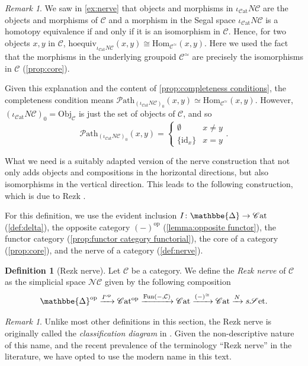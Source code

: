 \documentclass[11pt, a4paper]{amsart}
\def\DDelta{{\mathbbe{\Delta}}}
\newcommand{\DD}{\DDelta}
\newcommand{\cC}{\mathcal{C}}
\newcommand{\sN}{\mathscr{N}}
\newcommand{\Hom}{\mathrm{Hom}}
\newcommand{\op}{\mathrm{op}}
\newcommand{\Fun}{\mathrm{Fun}}
\newcommand{\sSet}{s\mathscr{S}\mathrm{et}}
\newcommand{\Cat}{\mathscr{C}\mathrm{at}}
\newcommand{\id}{\mathrm{id}}
\newcommand{\Obj}{\mathrm{Obj}}
\newcommand{\inccat}{\iota_{\Cat}}
\newcommand{\hoequiv}{\mathrm{hoequiv}}
\newcommand{\Path}{\mathscr{P}\mathrm{ath}}
\theoremstyle{definition}
\newtheorem{definition}[equation]{Definition}
\theoremstyle{remark}
\newtheorem{remark}[equation]{Remark}
\numberwithin{equation}{section}
\begin{document}
\begin{remark} \label{rem:nerve not complete}
 We saw in \cref{ex:nerve} that objects and morphisms in $\inccat N\cC$ are the objects and morphisms of $\cC$ and a morphism in the Segal space $\inccat N\cC$ is a homotopy equivalence if and only if it is an isomorphism in $\cC$. Hence, for two objects $x,y$ in $\cC$, $\hoequiv_{\inccat N\cC}(x,y) \cong \Hom_{\cC^\simeq}(x,y)$. Here we used the fact that the morphisms in the underlying groupoid $\cC^\simeq$ are precisely the isomorphisms in $\cC$ (\cref{prop:core}).

  
 Given this explanation and the content of \cref{prop:completeness conditions}, the completeness condition means $\Path_{(\inccat N\cC)_0}(x,y) \simeq \Hom_{\cC^\simeq}(x,y)$. However, $(\inccat N\cC)_0 = \Obj_\cC$ is just the set of objects of $\cC$, and so 
 \[
  \Path_{(\inccat N\cC)_0}(x,y)= \begin{cases} \emptyset & x \neq y \\ \{ \id_x \} & x=y \end{cases}.
 \]
\end{remark}
 
 What we need is a suitably adapted version of the nerve construction that not only adds objects and compositions in the horizontal directions, but also isomorphisms in the vertical direction. This leads to the following construction, which is due to Rezk \cite{rezk2001css}.

 For this definition, we use the evident inclusion $I\colon \DD \to \Cat$ (\cref{def:delta}), the opposite category $(-)^{\op}$ (\cref{lemma:opposite functor}), the functor category (\cref{prop:functor category functorial}), the core of a category (\cref{prop:core}), and the nerve of a category (\cref{def:nerve}).

 \begin{definition}[Rezk nerve] \label{def:rezk nerve}
  Let $\cC$ be a category. We define the \emph{Rezk nerve} of $\cC$ as the simplicial space $\sN \cC$ given by the following composition 
  \[ \DD^{\op} \xrightarrow{ I^{\op} } \Cat^{\op} \xrightarrow{\Fun(-,\cC)} \Cat \xrightarrow{ (-)^\simeq} \Cat \xrightarrow{N} \sSet.\] 
 \end{definition}

 \begin{remark} \label{rem:classification diagram}
  Unlike most other definitions in this section, the Rezk nerve is originally called the \emph{classification diagram} in \cite{rezk2001css}. Given the non-descriptive nature of this name, and the recent prevalence of the terminology ``Rezk nerve'' in the literature, we have opted to use the modern name in this text.
 \end{remark}
\end{document}
